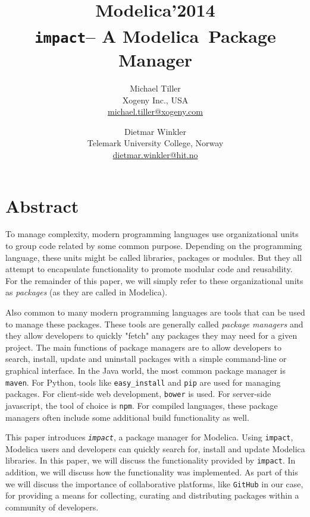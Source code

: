 \documentclass[11pt,a4paper,twocolumn]{article}
\newcommand{\myr}{\textsuperscript{\textregistered}}
\newcommand{\impact}{\texttt{impact}} %
\newcommand{\code}[1]{\texttt{#1}} %
\begin{document}
\title{\textbf{{\small Modelica'2014}\\
    \impact -- A Modelica\myr\ Package Manager}}

\author{Michael Tiller\\Xogeny Inc., USA\\\url{michael.tiller@xogeny.com} %
        \and Dietmar Winkler\\Telemark University College, Norway\\\url{dietmar.winkler@hit.no}}
\date{} %
\maketitle\thispagestyle{empty} %

\section*{Abstract}

To manage complexity, modern programming languages use organizational
units to group code related by some common purpose.  Depending on the
programming language, these units might be called libraries, packages
or modules.  But they all attempt to encapsulate functionality to
promote modular code and reusability.  For the remainder of this
paper, we will simply refer to these organizational units as
\emph{packages} (as they are called in Modelica).

Also common to many modern programming languages are tools that can be
used to manage these packages.  These tools are generally called
\emph{package managers} and they allow developers to quickly "fetch" any
packages they may need for a given project.  The main functions of
package managers are to allow developers to search, install, update
and uninstall packages with a simple command-line or graphical
interface.  In the Java world, the most common package manager is
\code{maven}.  For Python, tools like \code{easy\_install} and \code{pip} are
used for managing packages.  For client-side web development,
\code{bower} is used.  For server-side javascript, the tool of choice is
\code{npm}.  For compiled languages, these package managers often
include some additional build functionality as well.

This paper introduces \emph{\impact}, a package manager for Modelica.
  Using \impact, Modelica users and developers can quickly search
  for, install and update Modelica libraries.  In this paper, we will
  discuss the functionality provided by \impact.  In addition, we
  will discuss how the functionality was implemented.  As part of this
  we will discuss the importance of collaborative platforms, like
  \code{GitHub} in our case, for providing a means for collecting,
  curating and distributing packages within a community of developers.
\end{document}
